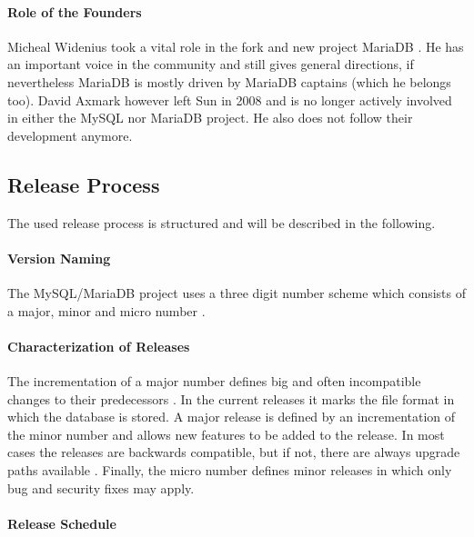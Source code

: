 \paragraph{Role of the Founders}

Micheal Widenius took a vital role in the fork and new project MariaDB
\cite{MySQLBehind,MySQLAbout}. He has an important voice in the community and
still gives general directions, if nevertheless MariaDB is mostly driven by
MariaDB captains (which he belongs too). David Axmark however left Sun in
2008 and is no longer actively involved in either the MySQL nor MariaDB
project. He also does not follow their development anymore.

\subsection{Release Process}

The used release process is structured and will be described in the following.

\paragraph{Version Naming}

The MySQL/MariaDB project uses a three digit number scheme which consists of a
major, minor and micro number \cite{MySQLVersion}.

\paragraph{Characterization of Releases}

The incrementation of a major number defines big and often incompatible changes
to their predecessors \cite{MySQLVersion}. In the current releases it marks the
file format in which the database is stored. A major release is defined by an
incrementation of the minor number and allows new features to be added to the
release. In most cases the releases are backwards compatible, but if not, there
are always upgrade paths available \cite{MySQLMariaDB5.1}. Finally, the micro
number defines minor releases in which only bug and security fixes may apply.

\paragraph{Release Schedule}

